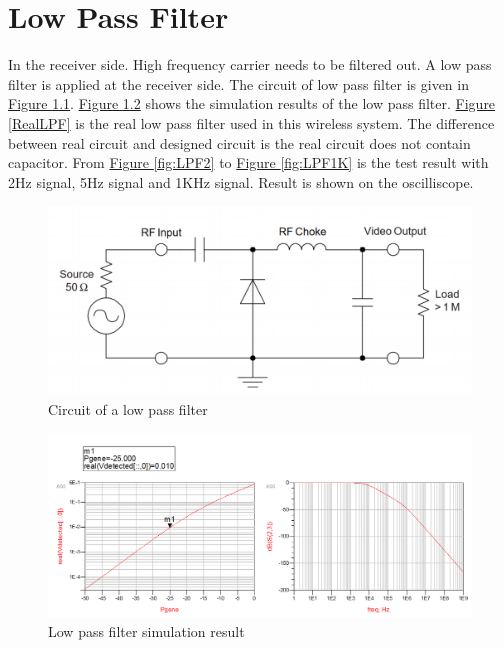 \documentclass[12pt,a4paper]{report}
\begin{document}
\chapter{Low Pass Filter}
In the receiver side. High frequency carrier needs to be filtered out. A low pass filter is applied at the receiver side. The circuit of low pass filter is given in \hyperref[fig:typical_detector_circuit]{Figure \ref*{fig:typical_detector_circuit}}.
\hyperref[LPFSimulationResult]{Figure \ref*{LPFSimulationResult}} shows the simulation results of the low pass filter. \hyperref[RealLPF]{Figure \ref*{RealLPF}} is the real low pass filter used in this wireless system. The difference between real
circuit and designed circuit is the real circuit does not contain capacitor. From \hyperref[fig:LPF2]{Figure \ref*{fig:LPF2}} to \hyperref[fig:LPF1K]{Figure \ref*{fig:LPF1K}} is the test result with 2Hz signal, 5Hz signal and 1KHz signal. Result is shown
on the oscilliscope.
\begin{figure}[ht]
    \centerline{\includegraphics[scale=1]{typical_detector_circuit}}
    \caption{Circuit of a low pass filter}
    \label{fig:typical_detector_circuit}
\end{figure}

\begin{figure}[H]
    \centerline{\includegraphics[scale=0.5]{LPF_SimulationResult.PNG}}
    \caption{Low pass filter simulation result}
    \label{LPFSimulationResult}
\end{figure}
\end{document}

